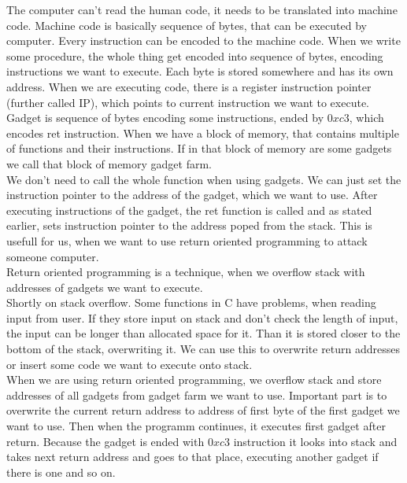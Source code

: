 \documentclass[a4paper]{article}
\begin{document}
The computer can't read the human code, it needs to be translated into machine code. Machine
code is basically sequence of bytes, that can be executed by computer. Every instruction
can be encoded to the machine code. When we write some procedure, the whole thing get encoded
into sequence of bytes, encoding instructions we want to execute. 
Each byte is stored somewhere and has its own address. When we are executing code,
there is a register instruction pointer (further called IP), which points to current instruction
we want to execute. \\
Gadget is sequence of bytes encoding some instructions, ended by $0xc3$, which encodes ret
instruction. When we have a block of memory, that contains multiple of functions and their  
instructions. If in that block of memory are some gadgets we call that block of memory gadget farm.
\\
We don't need to call the whole function when using gadgets. We can just set the instruction
pointer to the address of the gadget, which we want to use. After executing instructions 
of the gadget, the ret function is called and as stated earlier, sets instruction pointer
to the address poped from the stack. This is usefull for us, when we want to use return oriented
programming to attack someone computer.  \\
Return oriented programming is a technique, when we overflow stack with addresses of gadgets 
we want to execute. \\
Shortly on stack overflow. Some functions in C have problems, when reading input from user.
If they store input on stack and don't check the length of input, the input can be longer
than allocated space for it. Than it is stored closer to the bottom of the stack, overwriting
it. We can use this to overwrite return addresses or insert some code we want to execute onto stack.
\\
When we are using return oriented programming, we overflow stack and store addresses of all gadgets
from gadget farm we want to use. Important part is to overwrite the current return address to 
address of first byte of the first gadget we want to use. Then when the programm continues, it 
executes first gadget after return. Because the gadget is ended with $0xc3$ instruction it looks
into stack and takes next return address and goes to that place, executing another gadget if there 
is one and so on.
\end{document}

